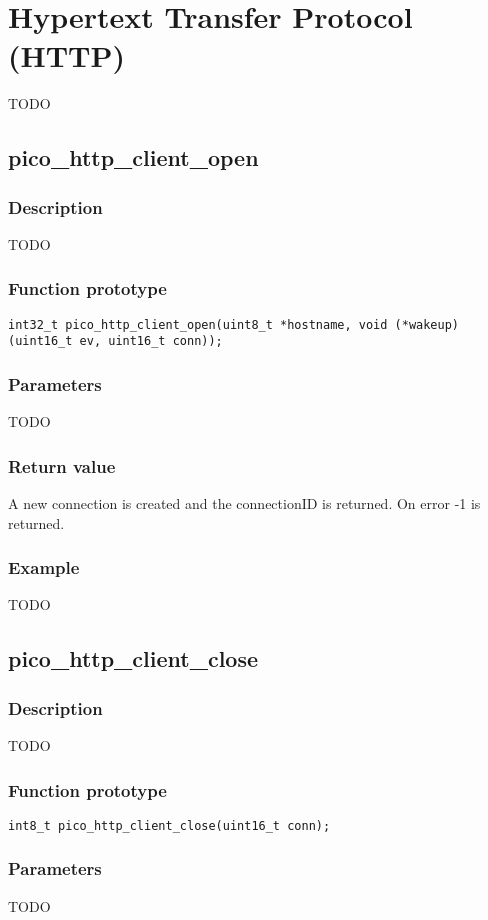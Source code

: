 \section{Hypertext Transfer Protocol (HTTP)}
TODO

\subsection{pico\_http\_client\_open}

\subsubsection*{Description}
TODO

\subsubsection*{Function prototype}
\texttt{int32\_t pico\_http\_client\_open(uint8\_t *hostname, void (*wakeup)(uint16\_t ev, uint16\_t conn));}

\subsubsection*{Parameters}
TODO
\subsubsection*{Return value}
A new connection is created and the connectionID is returned. On error -1 is returned.

\subsubsection*{Example}
TODO


\subsection{pico\_http\_client\_close}

\subsubsection*{Description}
TODO

\subsubsection*{Function prototype}
\texttt{int8\_t pico\_http\_client\_close(uint16\_t conn);}

\subsubsection*{Parameters}
TODO
